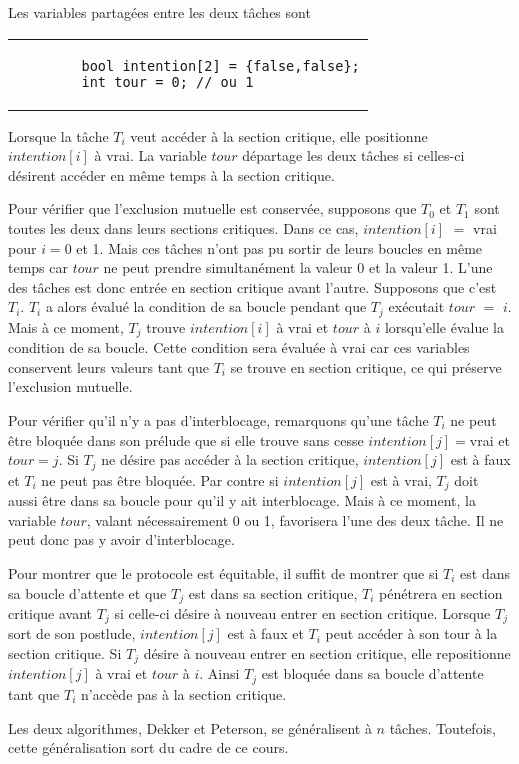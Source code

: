 Les variables partagées entre les deux tâches sont
\begin{center}
\begin{tabular}{l}
\lstset{language=C++}
\begin{lstlisting}
		bool intention[2] = {false,false};
		int tour = 0; // ou 1
\end{lstlisting}
\end{tabular}
\end{center}
\par\noindent
Lorsque la tâche $T_i$ veut accéder à la section critique, elle positionne $intention[i]$ à vrai.  La variable $tour$ départage les deux tâches si celles-ci désirent accéder en même temps à la section critique.
\par
Pour vérifier que l'exclusion mutuelle est conservée, supposons que $T_0$ et $T_1$ sont toutes les deux dans leurs sections critiques.
Dans ce cas, $intention[i]$ $=$ vrai pour $i = 0$ et 1.  Mais ces tâches n'ont pas pu sortir de leurs boucles en même temps car $tour$ ne peut prendre simultanément la valeur 0 et la valeur 1.  L'une des tâches est donc entrée en section critique avant l'autre. Supposons que c'est $T_i$. $T_i$ a alors évalué la condition de sa boucle pendant que $T_j$ exécutait $tour$ $=$ $i$.  Mais à ce moment, $T_j$ trouve $intention[i]$ à vrai et $tour$ à $i$ lorsqu'elle évalue la condition de sa boucle.
Cette condition sera évaluée à vrai car ces variables conservent leurs valeurs tant que $T_i$ se trouve en section critique, ce qui préserve l'exclusion mutuelle.
\par
Pour vérifier qu'il n'y a pas d'interblocage, remarquons qu'une tâche $T_i$ ne peut être bloquée dans son prélude que si elle trouve sans cesse $intention[j]=$vrai et $tour=j$.  Si $T_j$ ne désire pas accéder à la section critique, $intention[j]$ est à faux et $T_i$ ne peut pas être bloquée.  Par contre si $intention[j]$ est à vrai, $T_j$ doit aussi être dans sa boucle pour qu'il y ait interblocage.  Mais à ce moment, la variable $tour$, valant nécessairement 0 ou 1, favorisera l'une des deux tâche.  Il ne peut donc pas y avoir d'interblocage.
\par
Pour montrer que le protocole est équitable, il suffit de montrer que si $T_i$ est dans sa boucle d'attente et que $T_j$ est dans sa section critique, $T_i$ pénétrera en section critique avant $T_j$ si celle-ci désire à nouveau entrer en section critique.  Lorsque $T_j$ sort de son postlude, $intention[j]$ est à faux et $T_i$ peut accéder à son tour à la section critique.  Si $T_j$ désire à nouveau entrer en section critique, elle repositionne $intention[j]$ à vrai et $tour$ à $i$.  Ainsi $T_j$ est bloquée dans sa boucle d'attente tant que $T_i$ n'accède pas à la section critique.
\par
Les deux algorithmes, Dekker et Peterson, se généralisent à $n$ tâches. Toutefois, cette généralisation sort du cadre de ce cours.

